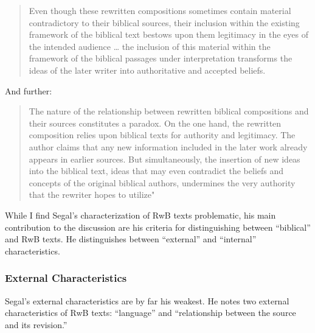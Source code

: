  \begin{quote} Even though these rewritten compositions sometimes contain material contradictory to their biblical sources, their inclusion within the existing framework of the biblical text bestows upon them legitimacy in the eyes of the intended audience \ldots{} the inclusion of this material within the framework of the biblical passages under interpretation transforms the ideas of the later writer into authoritative and accepted beliefs.\autocite[11]{segal_henze2005} \end{quote} 

 And further: 

 \begin{quote} The nature of the relationship between rewritten biblical compositions and their sources constitutes a paradox. On the one hand, the rewritten composition relies upon biblical texts for authority and legitimacy. The author claims that any new information included in the later work already appears in earlier sources. But simultaneously, the insertion of new ideas into the biblical text, ideas that may even contradict the beliefs and concepts of the original biblical authors, undermines the very authority that the rewriter hopes to utilize"\autocite[11-12]{segal_henze2005} \end{quote} 

 While I find Segal's characterization of RwB texts problematic, his main contribution to the discussion are his criteria for distinguishing between ``biblical'' and RwB texts. He distinguishes between ``external'' and ``internal'' characteristics. 

 \hypertarget{external-characteristics}{%
\subsubsection{External Characteristics}\label{external-characteristics}} 

 Segal's external characteristics are by far his weakest. He notes two external characteristics of RwB texts: ``language'' and ``relationship between the source and its revision.'' 

